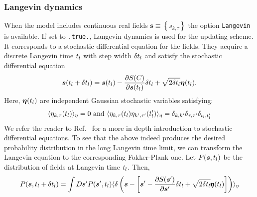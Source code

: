 

\subsubsection{Langevin dynamics}

When the model includes continuous real fields $\pmb{s} \equiv \left\{s_{k,\tau} \right\}$ the option \texttt{Langevin} is available. If set to \texttt{.true.}, Langevin dynamics is used for the updating scheme. It  corresponds to a  stochastic differential equation   for the fields. They acquire a discrete Langevin time $t_{l}$ with step width $\delta t_{l}$ and satisfy the stochastic differential equation
\begin{equation}\label{eqn:langevin}
   \boldsymbol{s}(t_{l} +  \delta t_{l})    =    \boldsymbol{s}(t_{l})    - \frac{\partial S(C) }{\partial    \boldsymbol{s}(t_{l}) }    \delta t_{l}     +\sqrt{2 \delta t_{l} } \boldsymbol{\eta}(t_{l}).
\end{equation}
Here,  $  \boldsymbol{\eta}(t_{l})  $   are  independent Gaussian  stochastic variables  satisfying:
\begin{equation}
        \langle  \eta_{k,\tau}(t_{l}) \rangle_{\eta}  = 0   \text{  and  }    \langle  \eta_{k,\tau}(t_{l})  \eta_{k',\tau'}(t_{l}') \rangle_{\eta}  = \delta_{k,k'} \delta_{\tau,\tau'} \delta_{t_{l},t_{l}'}
\end{equation}
We refer the reader to  Ref.~\cite{Gardiner}   for a more in depth introduction to stochastic differential equations.
To see that the above  indeed produces the desired probability distribution in the long Langevin time limit, we can transform the Langevin equation  to the corresponding Fokker-Plank one.  Let
$P(\boldsymbol{s}, t_{l}) $ be the distribution of fields at Langevin time $t_{l}$. Then,
\begin{equation}
        P(\boldsymbol{s}, t_{l}  + \delta t_{l} )    = \int D\boldsymbol{s}'  P  (\boldsymbol{s}', t_{l}  )    \langle    \delta \left(  \boldsymbol{s} - \left[ \boldsymbol{s}'   - \frac{\partial S(\boldsymbol{s}' )}{\partial    \boldsymbol{s}' }   \delta t_{l}     +\sqrt{2 \delta t_{l} } \pmb{\eta}(t_{l})  \right]    \right) \rangle_{\eta}
\end{equation}
